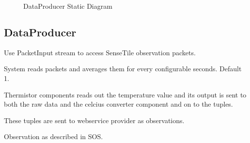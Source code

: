 \documentclass[]{final_report}
\begin{document}
 \begin{figure}
\caption{DataProducer Static Diagram}\label{fig:sensetile_static_diagam.png}
\end{figure}

\subsection{DataProducer}
Use PacketInput stream to access SenseTile observation packets.

System reads packets and averages them for every configurable seconds. Default 1.

Thermistor components reads out the temperature value
and its output is sent to both the raw data and the celcius
converter component and on to the tuples.

These tuples are sent to webservice provider as observations.

Observation as described in SOS.
\end{document}

